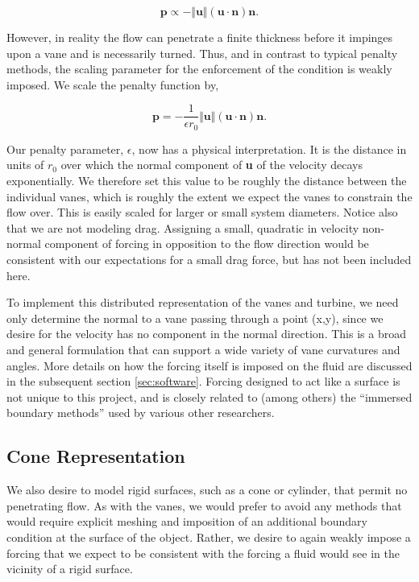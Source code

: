 \begin{equation}
 \textbf{p} \propto -\Vert \textbf{u} \Vert \left(\textbf{u} \cdot
					     \textbf{n} \right) 
  \textbf{n}.
\end{equation}

However, in reality the flow can penetrate a finite thickness
before it impinges upon a vane and is necessarily turned. Thus, and in
contrast to typical penalty methods, the scaling parameter for the
enforcement of the condition is weakly imposed. We scale the penalty
function by, 

\begin{equation}
 \textbf{p} = - \frac{1}{\epsilon r_0} \Vert \textbf{u} \Vert
  \left(\textbf{u} \cdot \textbf{n}\right) \textbf{n}.
\end{equation}

Our penalty parameter, $\epsilon$, now has a physical interpretation.
It is the distance in units of $r_0$ over which the normal component
of \textbf{u} of the velocity decays exponentially. We therefore set
this value to be roughly the distance between the individual vanes,
which is roughly the extent we expect the vanes to constrain the flow
over. This is easily scaled for larger or small system diameters. 
Notice also that we are not modeling drag. Assigning a small, quadratic
in velocity non-normal component of forcing in opposition to the flow direction
would be consistent with our expectations for a small drag force, but
has not been included here. 

To implement this distributed representation of the vanes and turbine,
we need only determine the normal to a vane passing through a
point (x,y), since we desire for the velocity has no component in the
normal direction. This is a broad and general formulation that can
support a wide variety of vane curvatures and angles. More details on
how the forcing itself is imposed on the fluid are discussed in the
subsequent section \ref{sec:software}. Forcing designed to act like a surface
is not unique to this project, and is closely related to (among others)
the ``immersed boundary methods'' used by various other
researchers\cite{doi:10.1146/annurev.fluid.37.061903.175743}. 

\subsection{Cone Representation}

We also desire to model rigid surfaces, such as a cone or cylinder, that
permit no penetrating flow. As with the vanes, we would prefer to avoid
any methods that would require explicit meshing and imposition of an
additional boundary condition at the surface of the object. Rather, we
desire to again weakly impose a forcing that we expect to be consistent
with the forcing a fluid would see in the vicinity of a rigid surface. 

